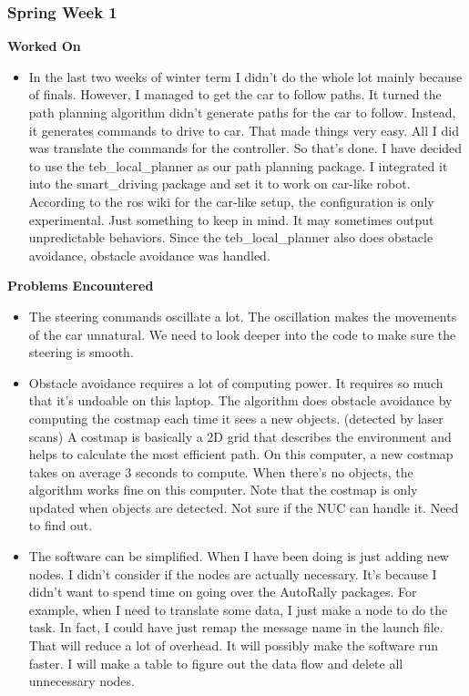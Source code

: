 \documentclass[compsoc,draftclsnofoot,onecolumn,10pt]{IEEEtran}
\begin{document}
\subsubsection*{Spring Week 1}
\textbf{Worked On}
\begin{itemize}
  \item In the last two weeks of winter term I didn't do the whole lot
  mainly because of finals. However, I managed to get the car to follow
  paths. It turned the path planning algorithm didn't generate paths for
  the car to follow. Instead, it generates commands to drive to car. That
  made things very easy. All I did was translate the commands for the
  controller. So that's done. I have decided to use the teb\_local\_planner
  as our path planning package. I integrated it into the smart\_driving
  package and set it to work on car-like robot. According to the ros wiki
  for the car-like setup, the configuration is only experimental. Just
  something to keep in mind. It may sometimes output unpredictable behaviors.
  Since the teb\_local\_planner also does obstacle avoidance, obstacle
  avoidance was handled.
\end{itemize}

\textbf{Problems Encountered}
\begin{itemize}
  \item The steering commands oscillate a lot. The oscillation makes the
  movements of the car unnatural. We need to look deeper into the code
  to make sure the steering is smooth.
  \item Obstacle avoidance requires a lot of computing power. It requires
  so much that it's undoable on this laptop. The algorithm does obstacle
  avoidance by computing the costmap each time it sees a new objects.
  (detected by laser scans) A costmap is basically a 2D grid that describes
  the environment and helps to calculate the most efficient path. On this
  computer, a new costmap takes on average 3 seconds to compute. When
  there's no objects, the algorithm works fine on this computer. Note that
  the costmap is only updated when objects are detected. Not sure if the
  NUC can handle it. Need to find out.
  \item The software can be simplified. When I have been doing is just
  adding new nodes. I didn't consider if the nodes are actually necessary.
  It's because I didn't want to spend time on going over the AutoRally
  packages. For example, when I need to translate some data, I just make
  a node to do the task. In fact, I could have just remap the message
  name in the launch file. That will reduce a lot of overhead. It will
  possibly make the software run faster. I will make a table to figure
  out the data flow and delete all unnecessary nodes.
\end{itemize}
\end{document}
